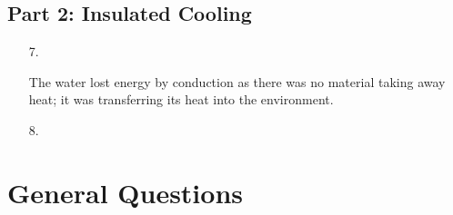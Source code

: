 ﻿\documentclass[12pt, letterpaper]{article}
\begin{document}
    \subsection*{Part 2: Insulated Cooling}

    \begin{enumerate}
        \item [7.]\mbox{}
        \begin{mdframed}
            The water lost energy by conduction as there was no material taking away heat; it was transferring its heat into the environment.
        \end{mdframed}

        \item [8.]\mbox{}
        \begin{mdframed}
            
        \end{mdframed}
    \end{enumerate}
    
    \section{General Questions}
\end{document}
